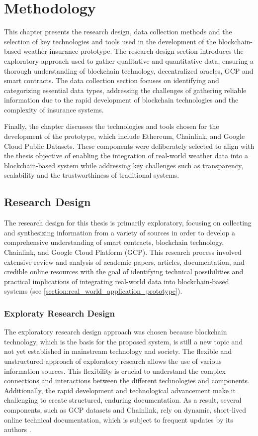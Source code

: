 \chapter{Methodology}\label{chapter:methodology}
This chapter presents the research design, data collection methods and the selection of key technologies and tools used in the development of the blockchain-based weather insurance prototype. The research design section introduces the exploratory approach used to gather qualitative and quantitative data, ensuring a thorough understanding of blockchain technology, decentralized oracles, GCP and smart contracts. The data collection section focuses on identifying and categorizing essential data types, addressing the challenges of gathering reliable information due to the rapid development of blockchain technologies and the complexity of insurance systems.

Finally, the chapter discusses the technologies and tools chosen for the development of the prototype, which include Ethereum, Chainlink, and Google Cloud Public Datasets. These components were deliberately selected to align with the thesis objective of enabling the integration of real-world weather data into a blockchain-based system while addressing key challenges such as transparency, scalability and the trustworthiness of traditional systems.

\section{Research Design}\label{section:research_design}
The research design for this thesis is primarily exploratory, focusing on collecting and synthesizing information from a variety of sources in order to develop a comprehensive understanding of smart contracts, blockchain technology, Chainlink, and Google Cloud Platform (GCP). This research process involved extensive review and analysis of academic papers, articles, documentation, and credible online resources with the goal of identifying technical possibilities and practical implications of integrating real-world data into blockchain-based systems (see \cref{section:real_world_application_prototype}).

\subsection{Exploraty Research Design}
The exploratory research design approach was chosen because blockchain technology, which is the basis for the proposed system, is still a new topic and not yet established in mainstream technology and society. The flexible and unstructured approach of exploratory research allows the use of various information sources. This flexibility is crucial to understand the complex connections and interactions between the different technologies and components. Additionally, the rapid development and technological advancement make it challenging to create structured, enduring documentation. As a result, several components, such as GCP datasets and Chainlink, rely on dynamic, short-lived online technical documentation, which is subject to frequent updates by its authors \autocite{kicsi2022exploratory}.

